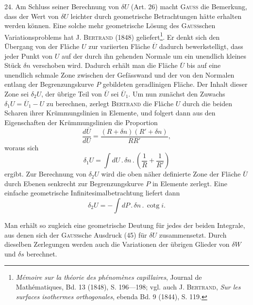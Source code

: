 \clearpage\begingroup\NoSourceHead{}
\renewcommand{\thefootnote}{\arabic{footnote})}\setcounter{footnote}{65}
\noindent\hspace*{\parindent}24. Am Schluss seiner Berechnung von $\delta U$ (Art. 26) macht \textsc{Gauss} die
Bemerkung, dass der Wert von $\delta U$ leichter durch geometrische Betrachtungen
hätte erhalten werden können. Eine solche mehr geometrische Lösung des
\textsc{Gauss}schen Variationsproblems hat J. \textsc{Bertrand} (1848) geliefert\footnote{\textit{Mémoire sur la théorie des phénomènes capillaires}, Journal de Mathématiques, Bd. 13 (1848),
S. 196—198; vgl. auch J. \textsc{Bertrand}, \textit{Sur les surfaces isothermes orthogonales}, ebenda Bd. 9 (1844), S. 119.}. Er denkt
sich den Übergang von der Fläche $U$ zur variierten Fläche $\overline U$ dadurch bewerkstelligt,
dass jeder Punkt von $U$ auf der durch ihn gehenden Normale
um ein unendlich kleines Stück $\delta n$ verschoben wird. Dadurch erhält man
die Fläche $\overline U$ bis auf eine unendlich schmale Zone zwischen der Gefässwand
und der von den Normalen entlang der Begrenzungskurve $P$ gebildeten geradlinigen
Fläche. Der Inhalt dieser Zone sei $\delta_2 U$, der übrige Teil von $\overline U$ sei
$\overline U_1$. Um nun zunächst den Zuwachs $\delta_1 U=\overline U_1-U$ zu berechnen, zerlegt
\textsc{Bertrand} die Fläche $U$ durch die beiden Scharen ihrer Krümmungslinien in
Elemente, und folgert dann aus den Eigenschaften der Krümmungslinien die
Proportion
\begin{equation*}\tag{63}
\frac{d\overline U}{dU}=\frac{(R+\delta n)(R'+\delta n)}{RR'},
\end{equation*}
woraus sich
\begin{equation*}\tag{64}
\delta_1 U=\int dU\mathpunct{.}\delta n\mathpunct{.}\left(\frac{1}{R}+\frac{1}{R'}\right)
\end{equation*}
ergibt. Zur Berechnung von $\delta_2 U$ wird die oben näher definierte Zone der
\clearpage{}
\noindent Fläche $\overline U$ durch Ebenen senkrecht zur Begrenzungskurve $P$ in Elemente zerlegt.
Eine einfache geometrische Infinitesimalbetrachtung liefert dann
\[
\delta_2 U=-\int dP\mathpunct{.}\delta n\mathpunct{.}\operatorname{cotg} i.
\]

Man erhält so zugleich eine geometrische Deutung für jedes der beiden
Integrale, aus denen sich der \textsc{Gauss}sche Ausdruck (45) für $\delta U$ zusammensetzt.
Durch dieselben Zerlegungen werden auch die Variationen der übrigen Glieder
von $\delta W$ und $\delta s$ berechnet.

